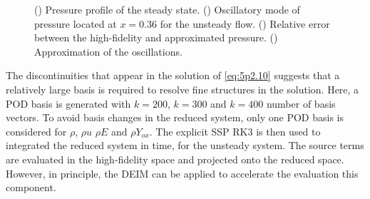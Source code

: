 \begin{figure}
\begin{subfigure}[]{0.48\linewidth}
  \caption{} \label{fig:5p2.2d}
  \label{oscill_focus}
  \end{subfigure}
  \caption{(\protect{}) Pressure profile of the steady state.  (\protect{}) Oscillatory mode of pressure located at $x=0.36$ for the unsteady flow. (\protect{}) Relative error between the high-fidelity and approximated pressure. (\protect{}) Approximation of the oscillations.} 
  \label{fig:5p2.2}
\end{figure}


The discontinuities that appear in the solution of \eqref{eq:5p2.10} suggests that a relatively large basis is required to resolve fine structures in the solution. Here, a POD basis is generated with $k=200$, $k=300$ and $k=400$ number of basis vectors. To avoid basis changes in the reduced system, only one POD basis is considered for $\rho$, $\rho u$ $\rho E$ and $\rho Y_{ox}$. The explicit SSP RK3 is then used to integrated the reduced system in time, for the unsteady system. The source terms are evaluated in the high-fidelity space and projected onto the reduced space. However, in principle, the DEIM can be applied to accelerate the evaluation this component. 

